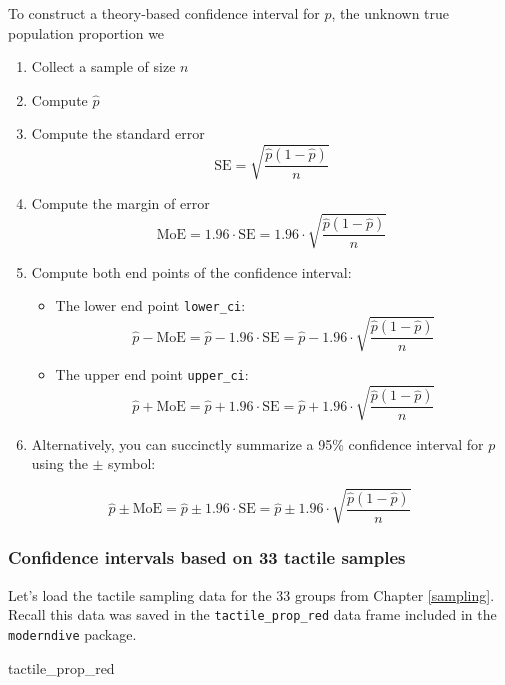 \documentclass[12pt, krantz2,]{krantz}
\makeatletter
\newenvironment{Shaded}{\begin{snugshade}}{\end{snugshade}}
\newcommand{\NormalTok}[1]{#1}
\providecommand{\tightlist}{%
  \setlength{\itemsep}{0pt}\setlength{\parskip}{0pt}}
\newenvironment{kframe}{%
\medskip{}
\setlength{\fboxsep}{.8em}
 \def\at@end@of@kframe{}%
 \ifinner\ifhmode%
  \def\at@end@of@kframe{\end{minipage}}%
  \begin{minipage}{\columnwidth}%
 \fi\fi%
 \def\FrameCommand##1{\hskip\@totalleftmargin \hskip-\fboxsep
 \colorbox{shadecolor}{##1}\hskip-\fboxsep
     \hskip-\linewidth \hskip-\@totalleftmargin \hskip\columnwidth}%
 \MakeFramed {\advance\hsize-\width
   \@totalleftmargin\z@ \linewidth\hsize
   \@setminipage}}%
 {\par\unskip\endMakeFramed%
 \at@end@of@kframe}
\renewenvironment{Shaded}{\begin{kframe}}{\end{kframe}}
\makeatother
\begin{document}
To construct a theory-based confidence interval for \(p\), the unknown true population proportion we

\begin{enumerate}
\def\labelenumi{\arabic{enumi}.}
\tightlist
\item
  Collect a sample of size \(n\)
\item
  Compute \(\widehat{p}\)
\item
  Compute the standard error \[\text{SE} = \sqrt{\frac{\widehat{p}(1-\widehat{p})}{n}}\]
\item
  Compute the margin of error \[\text{MoE} = 1.96 \cdot \text{SE} =  1.96 \cdot \sqrt{\frac{\widehat{p}(1-\widehat{p})}{n}}\]
\item
  Compute both end points of the confidence interval:

  \begin{itemize}
  \tightlist
  \item
    The lower end point \texttt{lower\_ci}: \[\widehat{p} - \text{MoE} = \widehat{p} - 1.96 \cdot \text{SE} = \widehat{p} - 1.96 \cdot \sqrt{\frac{\widehat{p}(1-\widehat{p})}{n}}\]
  \item
    The upper end point \texttt{upper\_ci}: \[\widehat{p} + \text{MoE} = \widehat{p} + 1.96 \cdot \text{SE} = \widehat{p} + 1.96 \cdot \sqrt{\frac{\widehat{p}(1-\widehat{p})}{n}}\]
  \end{itemize}
\item
  Alternatively, you can succinctly summarize a 95\% confidence interval for \(p\) using the \(\pm\) symbol:
\end{enumerate}

\[
\widehat{p} \pm \text{MoE} = \widehat{p} \pm 1.96 \cdot \text{SE} = \widehat{p} \pm 1.96 \cdot \sqrt{\frac{\widehat{p}(1-\widehat{p})}{n}}
\]

\hypertarget{confidence-intervals-based-on-33-tactile-samples}{%
\subsubsection*{Confidence intervals based on 33 tactile samples}\label{confidence-intervals-based-on-33-tactile-samples}}


Let's load the tactile sampling data for the 33 groups from Chapter \ref{sampling}. Recall this data was saved in the \texttt{tactile\_prop\_red} data frame included in the \texttt{moderndive} package.

\begin{Shaded}
\begin{Highlighting}[]
\NormalTok{tactile_prop_red}
\end{Highlighting}
\end{Shaded}
\end{document}

